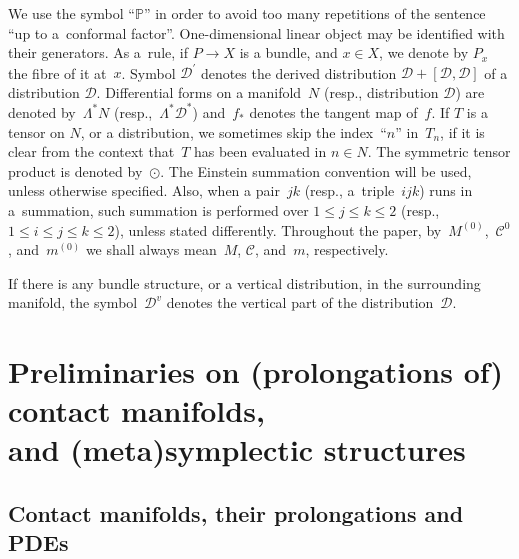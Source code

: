 \documentclass[pdftex]{sigma}
\newcommand{\C}{\mathcal{C}}
\newcommand{\D}{\mathcal{D}}
\renewcommand{\P}{\mathbb{P}}
\numberwithin{equation}{section}
\begin{document}
We use the symbol ``$\P$'' in order to avoid too many repetitions of the sentence ``up to a~conformal factor''.
One-dimensional linear object may be identif\/ied with their generators. As a~rule, if $P\to X$ is a bundle, and $x\in X$, we denote by $P_x$ the f\/ibre of it at~$x$. Symbol $\D^\prime$ denotes the derived distribution $\D+[\D,\D]$ of a distribution $\D$. Dif\/ferential forms on a mani\-fold~$N$ (resp., distribution $\D$) are denoted by~$\Lambda^\ast N$ (resp.,~$\Lambda^\ast \D^\ast$) and~$f_\ast$ denotes the tangent map of~$f$.
If $T$ is a tensor on $N$, or a distribution, we sometimes skip the index~``$n$'' in~$T_n$, if it is clear from the context that~$T$ has been evaluated in $n\in N$.
 The symmetric tensor product is denoted by~$\odot$.
The Einstein summation convention will be used, unless otherwise specif\/ied. Also, when a pair~$jk$ (resp., a~triple~$ijk$) runs in a~summation, such summation is performed over $1\leq j\leq k\leq 2$ (resp., $1\leq i\leq j\leq k\leq 2$), unless stated dif\/ferently.
Throughout the paper, by~$M^{(0)}$,~$\C^0$, and~$m^{(0)}$ we shall always mean~$M$, $\C$, and~$m$, respectively.

\begin{Remark}\label{remVerticale}
 If there is any bundle structure, or a vertical distribution, in the surrounding manifold, the symbol~$\D^v$ denotes the vertical part of the distribution~$\D$.
\end{Remark}

\section[Preliminaries on (prolongations of) contact manifolds, and (meta)symplectic structures]{Preliminaries on (prolongations of) contact manifolds,\\ and (meta)symplectic structures}\label{SecPrelim}

\subsection{Contact manifolds, their prolongations and PDEs}\label{sec.definitions.contact.and.prol}
\end{document}
